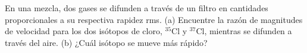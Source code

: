 \item En una mezcla, dos gases se difunden a través de un filtro en cantidades proporcionales a su respectiva rapidez rms. (a) Encuentre la razón de magnitudes de velocidad para los dos isótopos de cloro, $^{35}\text{Cl}$ y $^{37}\text{Cl}$, mientras se difunden a través del aire. (b) ¿Cuál isótopo se mueve más rápido?
